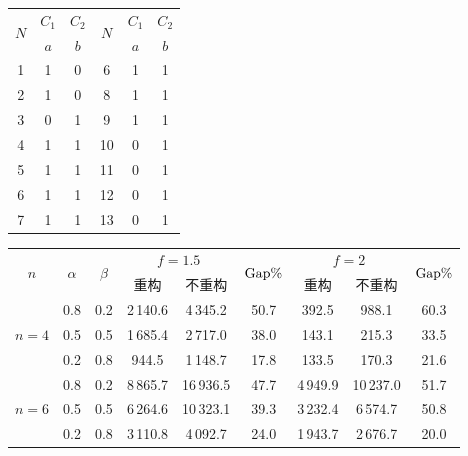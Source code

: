 \documentclass{ctacn}%
\begin{document}
\begin{multicols}{2}
\begin{center}
	\label{tab:1}
	\renewcommand\tabcolsep{10pt}
	\begin{tabular}{ccc||ccc}\toprule
		\multirow{2}{*}[-2pt]{$N$} &$C_1$ &$C_2$
		& \multirow{2}{*}[-2pt]{$N$} &$C_1$ &$C_2$ \\
		&$a$  &$b$     &    &$a$  &$b$  \\\hhline{---||---}
		1 & 1 & 0& $6$  & 1 & 1 \\
		2 & 1 & 0 &8 & 1 & 1 \\
		3 & 0 & 1 &9 & 1 & 1 \\
     	4 & 1 & 1 &10& 0 & 1 \\
		5 & 1 & 1 &11 & 0 & 1 \\
		6 & 1 & 1 &12& 0 & 1 \\
	    7 & 1 & 1 &13 & 0 & 1 \\
		\bottomrule
\end{tabular}\end{center}

\end{multicols}
\begin{center}
	\label{tab:1}
	\renewcommand\tabcolsep{10.6pt}%
	\begin{tabular}
{ccccccccc}\toprule
		\multirow{2}{*}[-2pt]{$n$}&\multirow{2}{*}[-2pt]{$\alpha$} &\multirow{2}{*}[-2pt]{$\beta$}&\multicolumn{2}{c}{$f=1.5$} &\multirow{2}{*}[-2pt]{${\rm{Gap}}\%$}&\multicolumn{2}{c}{\multirow{1}{*}{$f=2$}} &\multirow{2}{*}[-2pt]{${\rm{Gap}}\%$}\\
		\cmidrule(lr){4-5}\cmidrule(lr){7-8}
		&&&重构&不重构&&重构&不重构\\\midrule
		&0.8&0.2&2\,140.6&4\,345.2&50.7&392.5&988.1&60.3\\
		$n=4$&0.5&0.5&1\,685.4&2\,717.0&38.0&143.1&215.3&33.5\\
		&0.2&0.8&944.5&1\,148.7&17.8&133.5&170.3&21.6\\\midrule
		&0.8&0.2&8\,865.7&16\,936.5&47.7&4\,949.9&10\,237.0&51.7 \\
		$n=6$&0.5&0.5&6\,264.6&10\,323.1&39.3&3\,232.4&6\,574.7&50.8\\
		&0.2&0.8&3\,110.8&4\,092.7&24.0&1\,943.7&2\,676.7&20.0\\
		\bottomrule
\end{tabular}\end{center}
\end{document}
